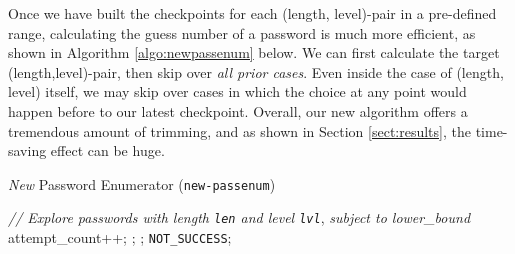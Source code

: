 \documentclass{article} %
\newcommand\comment[1]{\textit{#1}}
\theoremstyle{definition}
\theoremstyle{theorem}
\theoremstyle{remark}
\theoremstyle{remark}
\begin{document}
\par\quad Once we have built the checkpoints for each (length, level)-pair in a pre-defined range, calculating the guess number of a password is much more efficient, as shown in Algorithm \ref{algo:newpassenum} below. We can first calculate the target (length,level)-pair, then skip over \emph{all prior cases}. Even inside the case of (length, level) itself, we may skip over cases in which the choice at any point would happen before to our latest checkpoint. Overall, our new algorithm offers a tremendous amount of trimming, and as shown in Section \ref{sect:results}, the time-saving effect can be huge.

\begin{algorithm}[!htbp]
    \caption{\emph{New} Password Enumerator (\texttt{new-passenum})}
    \label{algo:newpassenum}
    \begin{algorithmic}
        \State
        \State\comment{// Explore passwords with length \texttt{len} and level \texttt{lvl}}, \emph{subject to lower_bound}
                  
                \State attempt\_count++;
                \State{};
            \Else                       {}
                       
                            \State{};
                        \EndIf
                    \EndFor
                \EndFor
                \State\Return \texttt{NOT_SUCCESS};
            \EndIf
        \EndFunction        


\end{algorithmic}
\end{algorithm}
\end{document}
